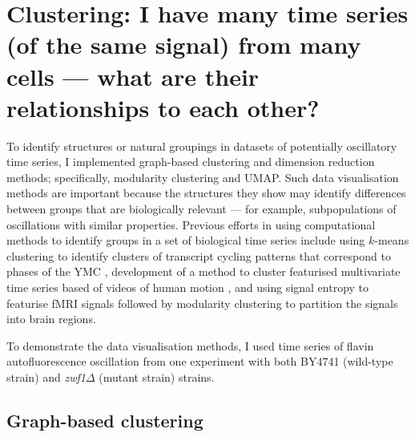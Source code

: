 


\section[Clustering]{Clustering: I have many time series (of the same signal) from many cells --- what are their relationships to each other?}
\label{sec:analysis-clustering}

To identify structures or natural groupings in datasets of potentially oscillatory time series, I implemented graph-based clustering and dimension reduction methods; specifically, modularity clustering and UMAP.
Such data visualisation methods are important because the structures they show may identify differences between groups that are biologically relevant --- for example, subpopulations of oscillations with similar properties.
Previous efforts in using computational methods to identify groups in a set of biological time series include using $k$-means clustering to identify clusters of transcript cycling patterns that correspond to phases of the YMC \parencite{tuLogicYeastMetabolic2005}, development of a method to cluster featurised multivariate time series based of videos of human motion \parencite{wangStructureBasedStatisticalFeatures2007}, and using signal entropy to featurise fMRI signals followed by modularity clustering to partition the signals into brain regions.

To demonstrate the data visualisation methods, I used time series of flavin autofluorescence oscillation from one experiment with both BY4741 (wild-type strain) and \textit{zwf1$\Delta$} (mutant strain) strains.

\subsection{Graph-based clustering}
\label{subsec:analysis-clustering-graphclustering}

